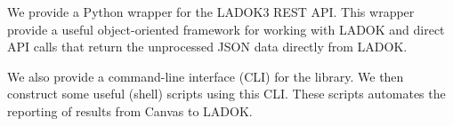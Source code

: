 We provide a Python wrapper for the LADOK3 REST API\@.
This wrapper provide a useful object-oriented framework for working with LADOK 
and direct API calls that return the unprocessed JSON data directly from 
LADOK\@.

We also provide a command-line interface (CLI) for the library.
We then construct some useful (shell) scripts using this CLI\@.
These scripts automates the reporting of results from Canvas to LADOK\@.
